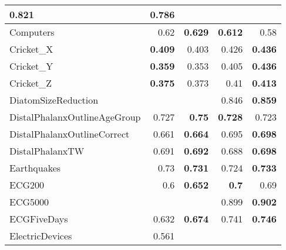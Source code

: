 \begin{longtable}{|l||r|r||r|r|}
\cellcolor[rgb]{ .973,  .796,  .678} \textbf{0.821} &
0.786
\bigstrut\\
\hline
Computers &
0.62 &
\cellcolor[rgb]{ .973,  .796,  .678} \textbf{0.629} &
\cellcolor[rgb]{ .973,  .796,  .678} \textbf{0.612} &
0.58
\bigstrut\\
\hline
\rowcolor[rgb]{ .851,  .851,  .851} Cricket\_X &
\cellcolor[rgb]{ .973,  .796,  .678} \textbf{0.409} &
0.403 &
0.426 &
\cellcolor[rgb]{ .973,  .796,  .678} \textbf{0.436}
\bigstrut\\
\hline
Cricket\_Y &
\cellcolor[rgb]{ .973,  .796,  .678} \textbf{0.359} &
0.353 &
0.405 &
\cellcolor[rgb]{ .973,  .796,  .678} \textbf{0.436}
\bigstrut\\
\hline
\rowcolor[rgb]{ .851,  .851,  .851} Cricket\_Z &
\cellcolor[rgb]{ .973,  .796,  .678} \textbf{0.375} &
0.373 &
0.41 &
\cellcolor[rgb]{ .973,  .796,  .678} \textbf{0.413}
\bigstrut\\
\hline
DiatomSizeReduction &
&
&
0.846 &
\cellcolor[rgb]{ .973,  .796,  .678} \textbf{0.859}
\bigstrut\\
\hline
\rowcolor[rgb]{ .851,  .851,  .851} DistalPhalanxOutlineAgeGroup &
0.727 &
\cellcolor[rgb]{ .973,  .796,  .678} \textbf{0.75} &
\cellcolor[rgb]{ .973,  .796,  .678} \textbf{0.728} &
0.723
\bigstrut\\
\hline
DistalPhalanxOutlineCorrect &
0.661 &
\cellcolor[rgb]{ .973,  .796,  .678} \textbf{0.664} &
0.695 &
\cellcolor[rgb]{ .973,  .796,  .678} \textbf{0.698}
\bigstrut\\
\hline
\rowcolor[rgb]{ .851,  .851,  .851} DistalPhalanxTW &
0.691 &
\cellcolor[rgb]{ .973,  .796,  .678} \textbf{0.692} &
0.688 &
\cellcolor[rgb]{ .973,  .796,  .678} \textbf{0.698}
\bigstrut\\
\hline
Earthquakes &
0.73 &
\cellcolor[rgb]{ .973,  .796,  .678} \textbf{0.731} &
0.724 &
\cellcolor[rgb]{ .973,  .796,  .678} \textbf{0.733}
\bigstrut\\
\hline
\rowcolor[rgb]{ .851,  .851,  .851} ECG200 &
0.6 &
\cellcolor[rgb]{ .973,  .796,  .678} \textbf{0.652} &
\cellcolor[rgb]{ .973,  .796,  .678} \textbf{0.7} &
0.69
\bigstrut\\
\hline
ECG5000 &
&
&
0.899 &
\cellcolor[rgb]{ .973,  .796,  .678} \textbf{0.902}
\bigstrut\\
\hline
\rowcolor[rgb]{ .851,  .851,  .851} ECGFiveDays &
0.632 &
\cellcolor[rgb]{ .973,  .796,  .678} \textbf{0.674} &
0.741 &
\cellcolor[rgb]{ .973,  .796,  .678} \textbf{0.746}
\bigstrut\\
\hline
ElectricDevices &
0.561 &

\end{longtable}
